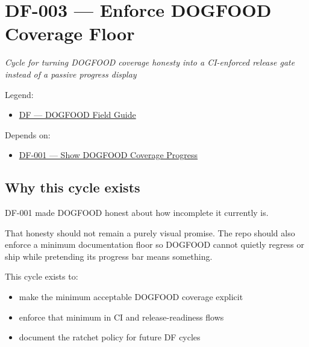 \chapter{DF-003 --- Enforce DOGFOOD Coverage Floor}\label{record-065}

\smallskip

\emph{Cycle for turning DOGFOOD coverage honesty into a CI-enforced release gate instead of a passive progress display}

Legend:

\begin{itemize}
\tightlist
\item
  \href{https://github.com/flyingrobots/bijou/blob/1853ad902f6bf219326409e7f743a5a1d6517dbc/docs/legends/DF-dogfood-field-guide.md}{DF --- DOGFOOD Field Guide}
\end{itemize}

Depends on:

\begin{itemize}
\tightlist
\item
  \href{https://github.com/flyingrobots/bijou/blob/cbd70612140e7a450d764b3c7be1c6af878b99bc/docs/design/DF-001-show-dogfood-coverage-progress.md}{DF-001 --- Show DOGFOOD Coverage Progress}
\end{itemize}

\section{Why this cycle exists}\label{record-065-why-this-cycle-exists}

DF-001 made DOGFOOD honest about how incomplete it currently is.

That honesty should not remain a purely visual promise. The repo should also enforce a minimum documentation floor so DOGFOOD cannot quietly regress or ship while pretending its progress bar means something.

This cycle exists to:

\begin{itemize}
\tightlist
\item
  make the minimum acceptable DOGFOOD coverage explicit
\item
  enforce that minimum in CI and release-readiness flows
\item
  document the ratchet policy for future DF cycles
\end{itemize}

